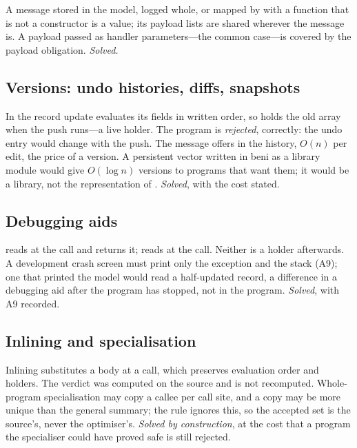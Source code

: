 A message stored in the model, logged whole, or mapped by  with a function that is not a
constructor is a value; its payload lists are shared wherever the message is. A payload passed as
handler parameters---the common case---is covered by the payload obligation. \emph{Solved.}

\subsection{Versions: undo histories, diffs, snapshots}
\label{sec:hard-undo}

In  the
record update evaluates its fields in written order, so  holds the old array when the
push runs---a live holder. The program is \emph{rejected}, correctly: the undo entry would change with
the push. The message offers  in the history, $O(n)$ per edit, the price of a
version. A persistent vector written in beni as a library module would give $O(\log n)$ versions to
programs that want them; it would be a library, not the representation of . \emph{Solved},
with the cost stated.

\subsection{Debugging aids}
\label{sec:hard-debug}

 reads  at the call and returns it;  reads at the call.
Neither is a holder afterwards. A development crash screen must print only the exception and the
stack (A9); one that printed the model would read a half-updated record, a difference in a debugging
aid after the program has stopped, not in the program. \emph{Solved}, with A9 recorded.

\subsection{Inlining and specialisation}
\label{sec:hard-optimiser}

Inlining substitutes a body at a call, which preserves evaluation order and holders. The verdict was
computed on the source and is not recomputed. Whole-program specialisation may copy a callee per call
site, and a copy may be more unique than the general summary; the rule ignores this, so the accepted
set is the source's, never the optimiser's. \emph{Solved by construction}, at the cost that a program
the specialiser could have proved safe is still rejected.
